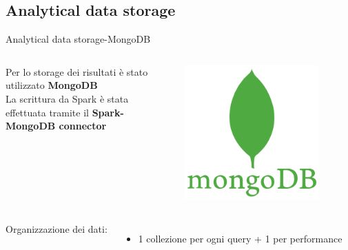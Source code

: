 \documentclass[13pt,aspectratio=169,t,xcolor=table]{beamer}
\begin{document}
\subsection{Analytical data storage}
\begin{frame}{Analytical data storage-MongoDB}
    \begin{columns}
    
            Per lo storage dei risultati è stato utilizzato \textbf{MongoDB} \\
            \vspace{0.2cm}
            La scrittura da Spark è stata effettuata tramite il \textbf{Spark-MongoDB connector}
        
            \begin{minipage}{0.5\textwidth}
                \raggedleft
                \includegraphics[width=0.8\textwidth]{res/mongodb_icon.png}
            \end{minipage}
    \end{columns}
    \vspace{0.5cm}
    \begin{columns}
            \begin{minipage}[b]{1\textwidth}
                Organizzazione dei dati:
                \begin{itemize}
                    \item 1 collezione per ogni query + 1 per performance

\end{itemize}
\end{minipage}
\end{columns}
\end{frame}
\end{document}
